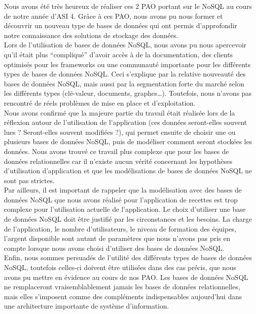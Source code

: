 Nous avons été très heureux de réaliser ces 2 PAO portant sur le NoSQL au cours de notre année d'ASI 4. Grâce à ces PAO, nous avons pu nous former et découvrir un nouveau type de bases de données qui ont permis d'approfondir notre connaissance des solutions de stockage des données.\\

Lors de l'utilisation de bases de données NoSQL, nous avons pu nous apercevoir qu'il était plus \enquote{compliqué} d'avoir accès à de la documentation, des clients optimisés pour les frameworks ou une communauté importante pour les différents types de bases de données NoSQL. Ceci s'explique par la relative nouveauté des bases de données NoSQL, mais aussi par la segmentation forte du marché selon les différents types (clé-valeur, documents, graphes\dots). Toutefois, nous n'avons pas rencontré de réels problèmes de mise en place et d'exploitation.\\

Nous avons confirmé que la majeure partie du travail était réalisée lors de la réflexion autour de l'utilisation de l'application (ces données seront-elles souvent lues ? Seront-elles souvent modifiées ?), qui permet ensuite de choisir une ou plusieurs bases de données NoSQL, puis de modéliser comment seront stockées les données. Nous avons trouvé ce travail plus complexe que pour les bases de données relationnelles car il n'existe aucun vérité concernant les hypothèses d'utilisation d'application et que les modélisations de bases de données NoSQL ne sont pas strictes.\\

Par ailleurs, il est important de rappeler que la modélisation avec des bases de données NoSQL que nous avons réalisé pour l'application de recettes est trop complexe pour l'utilisation actuelle de l'application. Le choix d'utiliser une base de données NoSQL doit être justifié par les circonstances et les besoins. La charge de l'application, le nombre d'utilisateurs, le niveau de formation des équipes, l'argent disponible sont autant de paramètres que nous n'avons pas pris en compte lorsque nous avons choisi d'utiliser des bases de données NoSQL.\\

Enfin, nous sommes persuadés de l'utilité des différents types de bases de données NoSQL, toutefois celles-ci doivent être utilisées dans des cas précis, que nous avons pu mettre en évidence au cours de nos PAO. Les bases de données NoSQL ne remplaceront vraisemblablement jamais les bases de données relationnelles, mais elles s'imposent comme des compléments indispensables aujourd'hui dans une architecture importante de système d'information.
